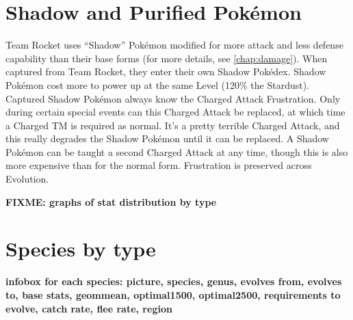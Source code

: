 \section{Shadow and Purified Pokémon}
Team Rocket uses ``Shadow'' Pokémon modified for more attack
 and less defense capability than their base forms (for more details,
 see \autoref{chap:damage}).
When captured from Team Rocket, they enter their own Shadow Pokédex.
Shadow Pokémon cost more to power up at the same Level (120\% the Stardust).
Captured Shadow Pokémon always know the Charged Attack Frustration.
Only during certain special events can this Charged Attack be replaced,
 at which time a Charged TM is required as normal.
It's a pretty terrible Charged Attack, and this really degrades the
 Shadow Pokémon until it can be replaced.
A Shadow Pokémon can be taught a second Charged Attack at any
 time, though this is also more expensive than for the normal form.
Frustration is preserved across Evolution.

\textbf{FIXME: graphs of stat distribution by type}
\section{Species by type}

\textbf{infobox for each species: picture, species, genus, evolves from, evolves to, base stats, geommean, optimal1500, optimal2500,
           requirements to evolve, catch rate, flee rate, region}



